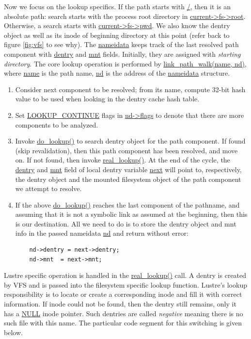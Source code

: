 Now we focus on the lookup specifics. If the path starts with \url{/}, then it
is an absolute path: search starts with the process root directory in
\url{current->fs->root}. Otherwise, a search starts with \url{current->fs->pwd}.
We also know the dentry object as well as its inode of beginning directory at
this point (refer back to figure \ref{fig:vfs} to see why). The
\url{nameidata} keeps track of the last resolved path component with \url{dentry}
and \url{mnt} fields.  Initially, they are assigned with \textit{starting
directory}. The core lookup operation is performed by \url{link_path_walk(name,
nd)}, where \url{name} is the path name, \url{nd} is the address of the 
\url{nameidata} structure.

\begin{enumerate}

\item Consider next component to be resolved; from its name, compute
32-bit hash value to be used when looking in the dentry cache hash
table.

\item Set \url{LOOKUP_CONTINUE} flags in \url{nd->flags} to denote that
there are more components to be analyzed.

\item Invoke \url{do_lookup()} to search dentry object for the path
component. If found (skip revalidation), then this path component
has been resolved, and move on. If not found, then invoke \url{real_lookup()}. At the
end of the cycle, the \url{dentry} and \url{mnt} field of local dentry
variable \url{next} will point to, respectively, the dentry object and
the mounted filesystem object of the path component we attempt to resolve.

\item If the above \url{do_lookup()} reaches the last component of
the pathname, and assuming that it is not a symbolic link as assumed
at the beginning, then this is our destination. All we need to do is to store
the dentry object and mnt info in the passed nameidata \url{nd} and return
without error:
\begin{Verbatim}
    nd->dentry = next->dentry;
    nd->mnt  = next->mnt;
\end{Verbatim}

\end{enumerate}

Lustre specific operation is handled in the \url{real_lookup()} call.  A
dentry is created by VFS and is passed into the filesystem specific lookup
function.  Lustre's lookup responsibility is to locate or create a
corresponding inode and fill it with correct information. If inode could not
be found, then the dentry still remains, only it has a \url{NULL} inode pointer.
Such dentries are called \textit{negative} meaning there is no such file with
this name. The particular code segment for this switching is given below.

